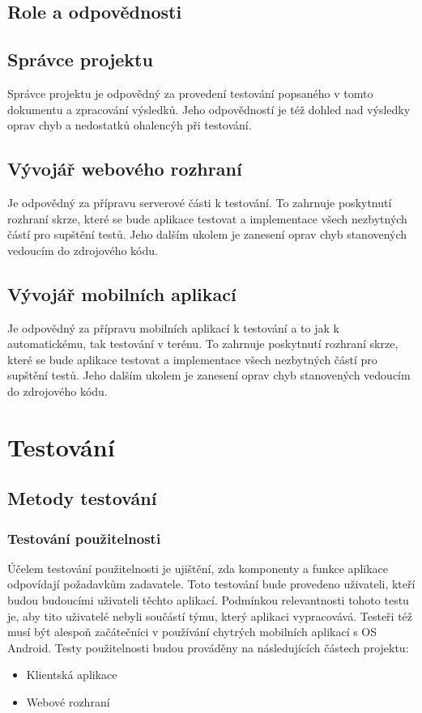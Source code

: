 \documentclass[a4paper,titlepage]{article}
\begin{document}
\subsection{Role a odpovědnosti}
	\subsection{Správce projektu}
	Správce projektu je odpovědný za provedení testování popsaného v tomto dokumentu a zpracování výsledků. Jeho odpovědností je též dohled nad výsledky oprav chyb a nedostatků ohalencýh při testování.
	\subsection{Vývojář webového rozhraní}
	Je odpovědný za přípravu serverové části k testování. To zahrnuje poskytnutí rozhraní skrze, které se bude aplikace testovat a implementace všech nezbytných částí pro supštění testů. Jeho dalším ukolem je zanesení oprav chyb stanovených vedoucím do zdrojového kódu.
	\subsection{Vývojář mobilních aplikací}
	Je odpovědný za přípravu mobilních aplikací k testování a to jak k automatickému, tak testování v terénu. To zahrnuje poskytnutí rozhraní skrze, které se bude aplikace testovat a implementace všech nezbytných částí pro supštění testů. Jeho dalším ukolem je zanesení oprav chyb stanovených vedoucím do zdrojového kódu.
\section{Testování}
\subsection{Metody testování}
	\subsubsection{Testování použitelnosti}
	Účelem testování použitelnosti je ujištění, zda komponenty a funkce aplikace odpovídají požadavkům zadavatele. Toto testování bude provedeno uživateli, kteří budou budoucími uživateli těchto aplikací. Podmínkou relevantnosti tohoto testu je, aby tito uživatelé nebyli součástí týmu, který aplikaci vypracovává. Testeři též musí být alespoň začátečníci v používání chytrých mobilních aplikací s OS Android. Testy použitelnosti budou prováděny na následujících částech projektu:
	\begin{itemize}
		\item Klientská aplikace
		\item Webové rozhraní
	\end{itemize}
\end{document}
